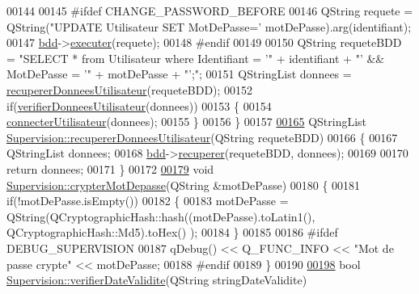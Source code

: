 \begin{DoxyCode}
00144 
00145 \textcolor{preprocessor}{    #ifdef CHANGE\_PASSWORD\_BEFORE}
00146     QString requete = QString(\textcolor{stringliteral}{"UPDATE Utilisateur SET MotDePasse='%
      motDePasse).arg(identifiant);
00147     \hyperlink{class_supervision_ac9a970d4f511f2eed5da4aed037533ab}{bdd}->\hyperlink{class_bdd_ab6ae645b4b54ce5df8dc9b422fb39faa}{executer}(requete);
00148 \textcolor{preprocessor}{    #endif}
00149 
00150     QString requeteBDD = \textcolor{stringliteral}{"SELECT * from Utilisateur where Identifiant =  '"} + identifiant + \textcolor{stringliteral}{"' &&
       MotDePasse = '"} + motDePasse + \textcolor{stringliteral}{"';"};
00151     QStringList donnees = \hyperlink{class_supervision_a137b6c505742a4ada6ab38193eef01dd}{recupererDonneesUtilisateur}(requeteBDD);
00152     \textcolor{keywordflow}{if}(\hyperlink{class_supervision_ae3400dad53c52bc09198e8d7f80e0e67}{verifierDonneesUtilisateur}(donnees))
00153     \{
00154         \hyperlink{class_supervision_a7c397ca5f79afa2709a657d7185dfbe1}{connecterUtilisateur}(donnees);
00155     \}
00156 \}
00157 
\hyperlink{class_supervision_a137b6c505742a4ada6ab38193eef01dd}{00165} QStringList \hyperlink{class_supervision_a137b6c505742a4ada6ab38193eef01dd}{Supervision::recupererDonneesUtilisateur}(QString 
      requeteBDD)
00166 \{
00167     QStringList donnees;
00168     \hyperlink{class_supervision_ac9a970d4f511f2eed5da4aed037533ab}{bdd}->\hyperlink{class_bdd_a8f25d29d309041bbf875700db0efd97b}{recuperer}(requeteBDD, donnees);
00169 
00170     \textcolor{keywordflow}{return} donnees;
00171 \}
00172 
\hyperlink{class_supervision_ac58c5b922ce85af75c2233cd3265d201}{00179} \textcolor{keywordtype}{void} \hyperlink{class_supervision_ac58c5b922ce85af75c2233cd3265d201}{Supervision::crypterMotDepasse}(QString &motDePasse)
00180 \{
00181     \textcolor{keywordflow}{if}(!motDePasse.isEmpty())
00182     \{
00183     motDePasse = QString(QCryptographicHash::hash((motDePasse).toLatin1(), QCryptographicHash::Md5).toHex()
      );
00184     \}
00185 
00186 \textcolor{preprocessor}{    #ifdef DEBUG\_SUPERVISION}
00187         qDebug() << Q\_FUNC\_INFO << \textcolor{stringliteral}{"Mot de passe crypte"} << motDePasse;
00188 \textcolor{preprocessor}{    #endif}
00189 \}
00190 
\hyperlink{class_supervision_acc886b933823993f1e3873582e05e690}{00198} \textcolor{keywordtype}{bool} \hyperlink{class_supervision_acc886b933823993f1e3873582e05e690}{Supervision::verifierDateValidite}(QString stringDateValidite)
}
\end{DoxyCode}
